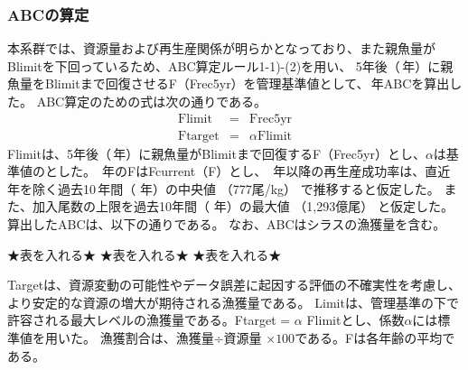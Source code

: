 \subsubsection{ABCの算定}
本系群では、資源量および再生産関係が明らかとなっており、また親魚量がBlimitを下回っているため、ABC算定ルール1-1)-(2)を用い、
5年後（\makeatletter{}\makeatother\,年）に親魚量をBlimitまで回復させるF（Frec5yr）を管理基準値として、\makeatletter{}\makeatother\,年ABCを算出した。														
ABC算定のための式は次の通りである。
\begin{eqnarray*}
\mathrm{Flimit} &=& \mathrm{Frec5yr}\\
\mathrm{Ftarget} &=& \alpha \mathrm{Flimit}
\end{eqnarray*}
Flimitは、5年後（\makeatletter{}\makeatother\,年）に親魚量がBlimitまで回復するF（Frec5yr）とし、$\alpha$は基準値の{\Alpha}とした。
{\ThisYr}\,年のFはFcurrent（F{\LastYr}）とし、
{\ThisYr}\,年以降の再生産成功率は、直近年を除く過去10\,年間（\makeatletter{}\makeatother\,\makeatletter{}\makeatother\,年）の中央値
（\textcolor[cmyk]{0,1,0,0}{777尾/kg}）
で推移すると仮定した。
また、加入尾数の上限を過去10年間（\makeatletter{}\makeatother\,\makeatletter{}\makeatother\,年）の最大値
（\textcolor[cmyk]{0,1,0,0}{1,293億尾}）
と仮定した。
算出したABCは、以下の通りである。
なお、ABCはシラスの漁獲量を含む。

★表を入れる★
★表を入れる★
★表を入れる★

Targetは、資源変動の可能性やデータ誤差に起因する評価の不確実性を考慮し、より安定的な資源の増大が期待される漁獲量である。
Limitは、管理基準の下で許容される最大レベルの漁獲量である。Ftarget = $\alpha$ Flimitとし、係数$\alpha$には標準値{\Alpha}を用いた。
漁獲割合は、漁獲量÷資源量 $\times100$である。Fは各年齢の平均である。
